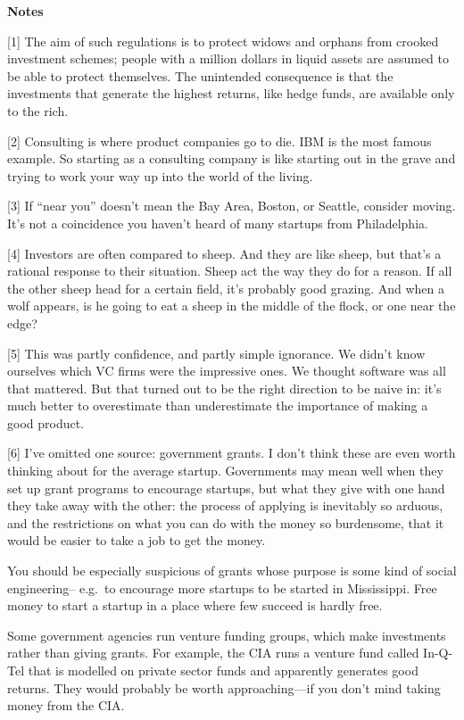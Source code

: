 \textbf{Notes}

{[}1{]} The aim of such regulations is to protect widows and orphans
from crooked investment schemes; people with a million dollars in liquid
assets are assumed to be able to protect themselves. The unintended
consequence is that the investments that generate the highest returns,
like hedge funds, are available only to the rich.

{[}2{]} Consulting is where product companies go to die. IBM is the most
famous example. So starting as a consulting company is like starting out
in the grave and trying to work your way up into the world of the
living.

{[}3{]} If ``near you'' doesn't mean the Bay Area, Boston, or Seattle,
consider moving. It's not a coincidence you haven't heard of many
startups from Philadelphia.

{[}4{]} Investors are often compared to sheep. And they are like sheep,
but that's a rational response to their situation. Sheep act the way
they do for a reason. If all the other sheep head for a certain field,
it's probably good grazing. And when a wolf appears, is he going to eat
a sheep in the middle of the flock, or one near the edge?

{[}5{]} This was partly confidence, and partly simple ignorance. We
didn't know ourselves which VC firms were the impressive ones. We
thought software was all that mattered. But that turned out to be the
right direction to be naive in: it's much better to overestimate than
underestimate the importance of making a good product.

{[}6{]} I've omitted one source: government grants. I don't think these
are even worth thinking about for the average startup. Governments may
mean well when they set up grant programs to encourage startups, but
what they give with one hand they take away with the other: the process
of applying is inevitably so arduous, and the restrictions on what you
can do with the money so burdensome, that it would be easier to take a
job to get the money.

You should be especially suspicious of grants whose purpose is some kind
of social engineering-- e.g.~to encourage more startups to be started in
Mississippi. Free money to start a startup in a place where few succeed
is hardly free.

Some government agencies run venture funding groups, which make
investments rather than giving grants. For example, the CIA runs a
venture fund called In-Q-Tel that is modelled on private sector funds
and apparently generates good returns. They would probably be worth
approaching---if you don't mind taking money from the CIA.

